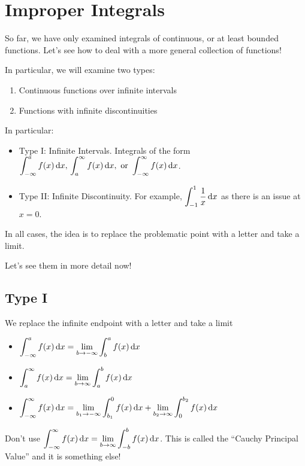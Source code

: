 \section{Improper Integrals}
So far, we have only examined integrals of continuous, or at
least bounded functions. Let's see how to deal with a more general
collection of functions!

In particular, we will examine two types:
\begin{enumerate}[label=(\arabic*)]
    \item Continuous functions over infinite intervals
    \item Functions with infinite discontinuities
\end{enumerate}

In particular:
\begin{itemize}
    \item Type I\@: Infinite Intervals. Integrals of the form
        $ \displaystyle \int_{-\infty}^{a} f(x)\odif{x},\,
        \int_{a}^{\infty} f(x)\odif{x},\text{ or }
        \int_{-\infty}^{\infty} f(x)\odif{x} $.
    \item Type II\@: Infinite Discontinuity. For example,
        $ \displaystyle \int_{-1}^{1} \frac{1}{x} \odif{x} $
        as there is an issue at $ x=0 $.
\end{itemize}

In all cases, the idea is to replace the problematic point with a
letter and take a limit.

Let's see them in more detail now!

\subsection*{Type I}
We replace the infinite endpoint with a letter and take a limit
\begin{itemize}
    \item $ \displaystyle \int_{-\infty}^{a} f(x)\odif{x} =\lim\limits_{{b} \to {-\infty}}
        \int_{b}^{a} f(x)\odif{x} $
    \item $ \displaystyle \int_{a}^{\infty} f(x)\odif{x} =\lim\limits_{{b} \to {\infty}}
        \int_{a}^{b} f(x)\odif{x} $
    \item $ \displaystyle  \int_{-\infty}^{\infty} f(x)\odif{x}=
        \lim\limits_{{b_1} \to {-\infty}} \int_{b_1}^{0} f(x)\odif{x}+
        \lim\limits_{{b_2} \to {\infty}} \int_{0}^{b_2} f(x)\odif{x} $
\end{itemize}
\begin{Remark}{}{}
    Don't use
    $ \displaystyle \int_{-\infty}^{\infty} f(x)\odif{x}=\lim\limits_{{b} \to {\infty}}
    \int_{-b}^{b} f(x)\odif{x} $.
    This is called the ``Cauchy Principal Value'' and it is something else!
\end{Remark}


